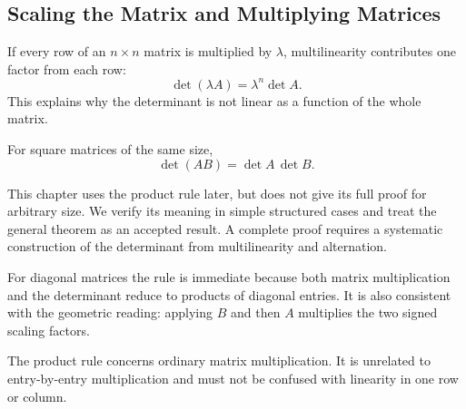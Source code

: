 \subsection{Scaling the Matrix and Multiplying Matrices}

If every row of an $n\times n$ matrix is multiplied by $\lambda$, multilinearity contributes one factor from each row:
\[
\boxed{\det(\lambda A)=\lambda^n\det A}.
\]
This explains why the determinant is not linear as a function of the whole matrix.

\begin{theorembox}
For square matrices of the same size,
\[
\boxed{\det(AB)=\det A\,\det B}.
\]
\end{theorembox}

\begin{remarkbox}
This chapter uses the product rule later, but does not give its full proof for arbitrary size. We verify its meaning in simple structured cases and treat the general theorem as an accepted result. A complete proof requires a systematic construction of the determinant from multilinearity and alternation.
\end{remarkbox}

For diagonal matrices the rule is immediate because both matrix multiplication and the determinant reduce to products of diagonal entries. It is also consistent with the geometric reading: applying $B$ and then $A$ multiplies the two signed scaling factors.

The product rule concerns ordinary matrix multiplication. It is unrelated to entry-by-entry multiplication and must not be confused with linearity in one row or column.
